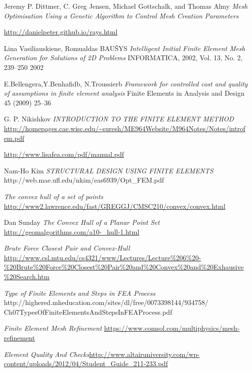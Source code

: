 \begin{changemargin}{\CMwidth}{\CMheight}
\begin{thebibliography}{9}
 Jeremy P. Dittmer, C. Greg Jensen, Michael Gottschalk, and Thomas Almy \emph{Mesh Optimisation Using a Genetic Algorithm to Control Mesh Creation Parameters}

 \url{http://danielpeter.github.io/rays.html}

 Lina Vasiliauskiene, Romualdas BAUŠYS \emph{Intelligent Initial Finite Element Mesh Generation for Solutions of 2D Problems} INFORMATICA, 2002, Vol. 13, No. 2, 239–250 2002

 E.Bellengera,Y.Benhafidb, N.Troussierb \emph{Framework for controlled cost and quality of assumptions in finite element analysis} Finite Elements in Analysis and Design 45 (2009) 25--36

 G. P. Nikishkov \emph{INTRODUCTION TO THE FINITE ELEMENT METHOD} \url{http://homepages.cae.wisc.edu/~suresh/ME964Website/M964Notes/Notes/introfem.pdf}

 \url{http://www.lisafea.com/pdf/manual.pdf}

Nam-Ho Kim \emph{STRUCTURAL DESIGN USING FINITE ELEMENTS} http://web.mae.ufl.edu/nkim/eas6939/Opt\_FEM.pdf


 \emph{The convex hull of a set of points} \url{http://www2.lawrence.edu/fast/GREGGJ/CMSC210/convex/convex.html} 

 Dan Sunday \emph{The Convex Hull of a Planar Point Set} \url{http://geomalgorithms.com/a10-_hull-1.html}

 \emph{Brute Force Closest Pair and Convex-Hull} \url{http://www.csl.mtu.edu/cs4321/www/Lectures/Lecture\%206\%20-\%20Brute\%20Force\%20Closest\%20Pair\%20and\%20Convex\%20and\%20Exhausive\%20Search.htm}

\emph{Type of Finite Elements and Steps in FEA Process}\\
http://highered.mheducation.com/sites/dl/free/0073398144/934758/\\Ch07TypesOfFiniteElementsAndStepsInFEAProcess.pdf 

\emph{Finite Element Mesh Refinement} \url{https://www.comsol.com/multiphysics/mesh-refinement}


\emph{Element Quality And Checks}\url{http://www.altairuniversity.com/wp-content/uploads/2012/04/Student_Guide_211-233.pdf}


\end{thebibliography}
\end{changemargin}
